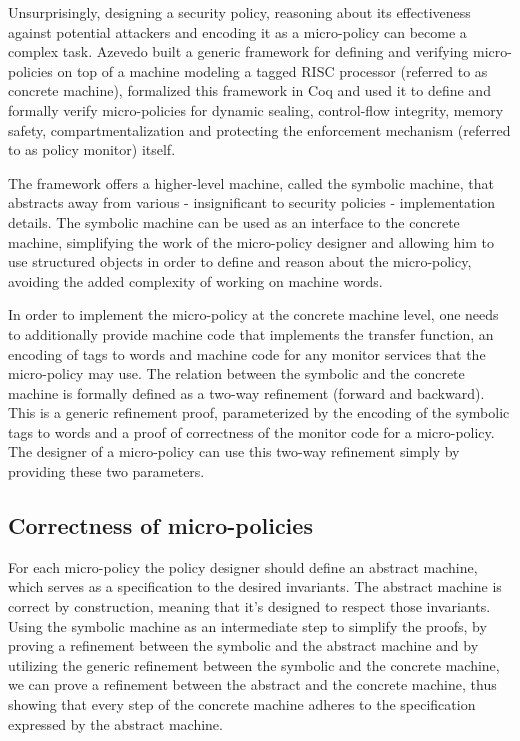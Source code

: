 Unsurprisingly, designing a security policy, reasoning about its
effectiveness against potential attackers and encoding it as a
micro-policy can become a complex task. Azevedo \ETAL
\cite{popl2015} built a generic framework for defining and
verifying micro-policies on top of a machine modeling a tagged RISC
processor (referred to as concrete machine), formalized this framework
in Coq and used it to define and formally verify micro-policies for
dynamic sealing, control-flow integrity, memory safety,
compartmentalization and protecting the enforcement mechanism
(referred to as policy monitor) itself.

The framework offers a higher-level machine, called the symbolic
machine, that abstracts away from various - insignificant to security
policies - implementation details. The symbolic machine can be used as
an interface to the concrete machine, simplifying the work of the
micro-policy designer and allowing him to use structured objects in
order to define and reason about the micro-policy, avoiding the
added complexity of working on machine words.

In order to implement the micro-policy at the concrete machine level, one needs
to additionally provide machine code that implements the transfer function, an
encoding of tags to words and machine code for any monitor services that the
micro-policy may use. The relation between the symbolic and the concrete machine
is formally defined as a two-way refinement (forward and backward). This is a
generic refinement proof, parameterized by the encoding of the symbolic tags to
words and a proof of correctness of the monitor code for a micro-policy.
The designer of a micro-policy can use this two-way refinement simply by
providing these two parameters.

\subsection{Correctness of micro-policies}\label{sec:verification}

For each micro-policy the policy designer should define an abstract
machine, which serves as a specification to the desired invariants.
The abstract machine is correct by construction, meaning that it's
designed to respect those invariants. Using the symbolic machine as an
intermediate step to simplify the proofs, by proving a refinement
between the symbolic and the abstract machine and by utilizing the
generic refinement between the symbolic and the concrete machine, we
can prove a refinement between the abstract and the concrete machine,
thus showing that every step of the concrete machine adheres to the
specification expressed by the abstract machine.


